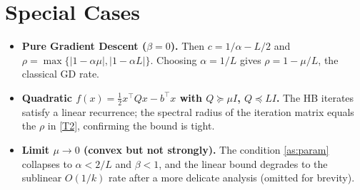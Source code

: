\documentclass[11pt]{article}
\begin{document}
\section*{Special Cases}
\begin{itemize}[leftmargin=2cm]
\item \textbf{Pure Gradient Descent ($\beta=0$).}  Then $c=1/\alpha-L/2$ and $\rho=\max\{|1-\alpha\mu|,|1-\alpha L|\}$.  Choosing $\alpha=1/L$ gives $\rho=1-\mu/L$, the classical GD rate.
\item \textbf{Quadratic $f(x)=\frac12 x^{\top}Qx-b^{\top}x$ with $Q\succeq\mu I$, $Q\preceq L I$.}  The HB iterates satisfy a linear recurrence; the spectral radius of the iteration matrix equals the $\rho$ in \eqref{T2}, confirming the bound is tight.
\item \textbf{Limit $\mu\to0$ (convex but not strongly).}  The condition \ref{as:param} collapses to $\alpha<2/L$ and $\beta<1$, and the linear bound degrades to the sublinear $O(1/k)$ rate after a more delicate analysis (omitted for brevity).
\end{itemize}
\end{document}
